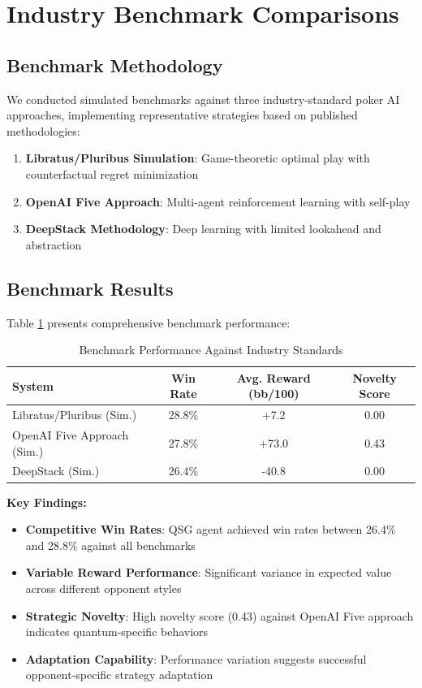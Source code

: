 \documentclass[11pt,a4paper]{article}
\begin{document}
\section{Industry Benchmark Comparisons}

\subsection{Benchmark Methodology}

We conducted simulated benchmarks against three industry-standard poker AI approaches, implementing representative strategies based on published methodologies:

\begin{enumerate}
\item \textbf{Libratus/Pluribus Simulation}: Game-theoretic optimal play with counterfactual regret minimization
\item \textbf{OpenAI Five Approach}: Multi-agent reinforcement learning with self-play
\item \textbf{DeepStack Methodology}: Deep learning with limited lookahead and abstraction
\end{enumerate}

\subsection{Benchmark Results}

Table \ref{tab:benchmark_results} presents comprehensive benchmark performance:

\begin{table}[h]
\centering
\begin{tabular}{@{}lccc@{}}
\toprule
\textbf{System} & \textbf{Win Rate} & \textbf{Avg. Reward (bb/100)} & \textbf{Novelty Score} \\
\midrule
Libratus/Pluribus (Sim.) & 28.8\% & +7.2 & 0.00 \\
OpenAI Five Approach (Sim.) & 27.8\% & +73.0 & 0.43 \\
DeepStack (Sim.) & 26.4\% & -40.8 & 0.00 \\
\bottomrule
\end{tabular}
\caption{Benchmark Performance Against Industry Standards}
\label{tab:benchmark_results}
\end{table}

\textbf{Key Findings:}

\begin{itemize}
\item \textbf{Competitive Win Rates}: QSG agent achieved win rates between 26.4\% and 28.8\% against all benchmarks
\item \textbf{Variable Reward Performance}: Significant variance in expected value across different opponent styles
\item \textbf{Strategic Novelty}: High novelty score (0.43) against OpenAI Five approach indicates quantum-specific behaviors
\item \textbf{Adaptation Capability}: Performance variation suggests successful opponent-specific strategy adaptation
\end{itemize}
\end{document}
